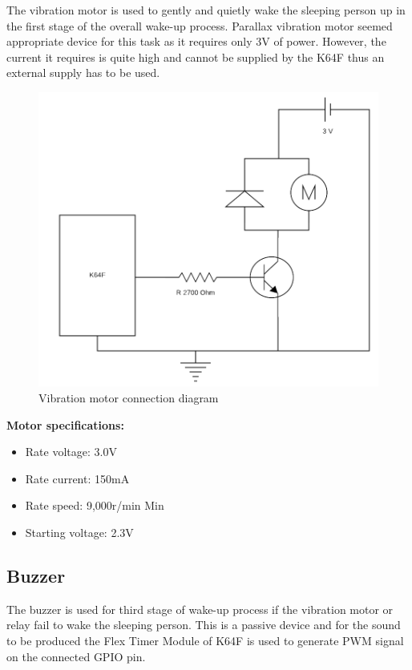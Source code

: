 \documentclass[12pt,a4paper]{article}
\begin{document}
		The vibration motor is used to gently and quietly wake the sleeping person up in the first stage of the overall wake-up process. Parallax vibration motor seemed appropriate device for this task as it requires only 3V of power. However, the current it requires is quite high and cannot be supplied by the K64F thus an external supply has to be used.\\
		
		\begin{figure}[h]
			\centering
			\includegraphics[scale=0.3]{motor_diag1.png}
			\caption{Vibration motor connection diagram}
		\end{figure}

		{\bfseries Motor specifications:}
		\begin{itemize}
			\item Rate voltage: 3.0V
			\item Rate current: 150mA
			\item Rate speed: 9,000r/min Min
			\item Starting voltage: 2.3V
		\end{itemize}

		\subsection{Buzzer}
		The buzzer is used for third stage of wake-up process if the vibration motor or relay fail 
		to wake the sleeping person. This is a passive device and for the sound to be produced  
		the Flex Timer Module of K64F is used to generate PWM signal on the connected GPIO pin.
		
\end{document}
